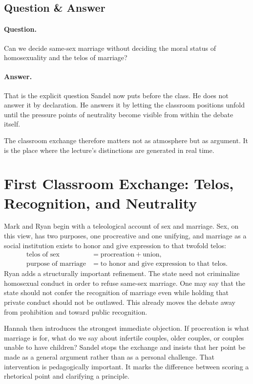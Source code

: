 \subsection{Question \& Answer}

\paragraph{Question.} Can we decide same-sex marriage without deciding the moral status of homosexuality and the telos of marriage?

\paragraph{Answer.} That is the explicit question Sandel now puts before the class. He does not answer it by declaration. He answers it by letting the classroom positions unfold until the pressure points of neutrality become visible from within the debate itself.

The classroom exchange therefore matters not as atmosphere but as argument. It is the place where the lecture's distinctions are generated in real time.

\section{First Classroom Exchange: Telos, Recognition, and Neutrality}

Mark and Ryan begin with a teleological account of sex and marriage. Sex, on this view, has two purposes, one procreative and one unifying, and marriage as a social institution exists to honor and give expression to that twofold telos:
\begin{align}
\text{telos of sex}
&=
\text{procreation} + \text{union},\\
\text{purpose of marriage}
&=
\text{to honor and give expression to that telos}.
\end{align}
Ryan adds a structurally important refinement. The state need not criminalize homosexual conduct in order to refuse same-sex marriage. One may say that the state should not confer the recognition of marriage even while holding that private conduct should not be outlawed. This already moves the debate away from prohibition and toward public recognition.

Hannah then introduces the strongest immediate objection. If procreation is what marriage is for, what do we say about infertile couples, older couples, or couples unable to have children? Sandel stops the exchange and insists that her point be made as a general argument rather than as a personal challenge. That intervention is pedagogically important. It marks the difference between scoring a rhetorical point and clarifying a principle.

